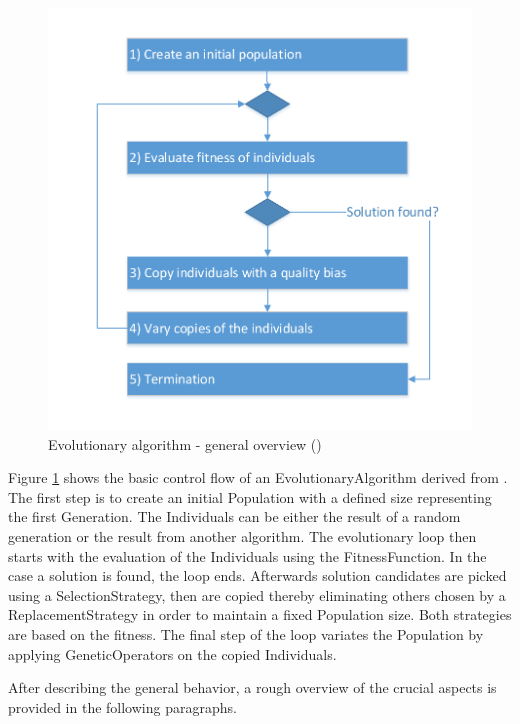 \begin{figure}[htb]
	\centering
	\includegraphics[scale=0.6, trim=0cm 1cm 0cm 1cm, clip=true]{Images/AlgorithmEA_GeneralOverview.pdf} 
	\caption{Evolutionary algorithm - general overview (\cite{Ashlock2004})}
	\label{figEvolutionaryAlgorithmGeneralOverview}
\end{figure}

Figure \ref{figEvolutionaryAlgorithmGeneralOverview} shows the basic control flow of an \gls{EvolutionaryAlgorithm} derived from \cite{Ashlock2004}. The first step is to create an initial \gls{Population} with a defined size representing the first \gls{Generation}. The \glspl{Individual} can be either the result of a random generation or the result from another algorithm.
The evolutionary loop then starts with the evaluation of the \glspl{Individual} using the \gls{FitnessFunction}. In the case a solution is found, the loop ends. Afterwards solution candidates are picked using a \gls{SelectionStrategy}, then are copied thereby eliminating others chosen by a \gls{ReplacementStrategy} in order to maintain a fixed \gls{Population} size. Both strategies are based on the fitness.
The final step of the loop variates the \gls{Population} by applying \glspl{GeneticOperator} on the copied \glspl{Individual}.

After describing the general behavior, a rough overview of the crucial aspects is provided in the following paragraphs.

